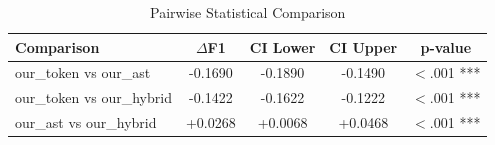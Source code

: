 \begin{table}[h]
\centering
\caption{Pairwise Statistical Comparison}
\label{tab:significance}
\begin{tabular}{lcccc}
\toprule
Comparison & $\Delta$F1 & CI Lower & CI Upper & p-value \\
\midrule
our_token vs our_ast & -0.1690 & -0.1890 & -0.1490 & $<$.001 *** \\
our_token vs our_hybrid & -0.1422 & -0.1622 & -0.1222 & $<$.001 *** \\
our_ast vs our_hybrid & +0.0268 & +0.0068 & +0.0468 & $<$.001 *** \\
\bottomrule
\end{tabular}
\end{table}